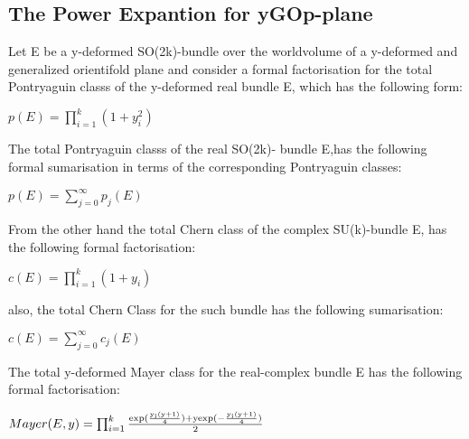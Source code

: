 \documentclass[a4paper,a4paper]{article}
\begin{document}
\subsection{The Power Expantion for yGOp-plane }
Let E be a y-deformed  SO(2k)-bundle over the worldvolume of a y-deformed and generalized orientifold plane and consider a formal factorisation for the total Pontryaguin classs of the y-deformed real bundle E, which has the following form:

\begin{center}
{  $ p(E) = \prod_{i=1}^k(1+y_i^2)$ }
\end{center}
The total Pontryaguin classs of the real SO(2k)- bundle E,has the following formal sumarisation in terms of the corresponding Pontryaguin classes: 
\begin{center}
{  $ p(E) = \sum_{j=0}^{\infty}p_j(E) $ }
\end{center}
From the other hand the total Chern class of the complex SU(k)-bundle E, has the following formal factorisation:
\begin{center}
{  $ c(E) = \prod_{i=1}^{k}(1+y_i)$ }
\end{center}
also, the total Chern Class for the such bundle has the following sumarisation:
\begin{center}
{  $ c(E) = \sum_{j=0}^{\infty}c_j(E) $ }
\end{center} 
The total  y-deformed Mayer class for the real-complex bundle E has the following formal factorisation:

\begin{center}
{  $ Mayer(E,y) = \prod_{i=1}^k\frac{\rm exp(\frac{\rm y_i(y + 1)}{\rm 4})+yexp(-\frac{\rm y_i(y + 1)}{\rm 4})}{\rm 2}$ }
\end{center}
\end{document}
